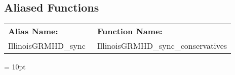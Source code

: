 \subsection*{Aliased Functions}

\hspace{5mm}

 \begin{tabular*}{160mm}{ll} 

{\bf Alias Name:} ~~~~~~~ & {\bf Function Name:} \\ 
IllinoisGRMHD\_sync & IllinoisGRMHD\_sync\_conservatives \\ 
\end{tabular*} 



\vspace{5mm}\parskip = 10pt 

